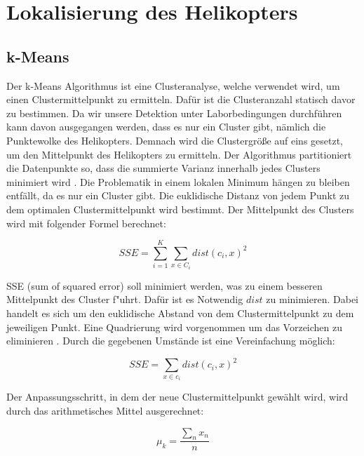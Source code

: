 \section{Lokalisierung des Helikopters} 
\label{sec:lokalisierung}

\subsection{k-Means}
\label{subsec:kmeans}

Der k-Means Algorithmus ist eine Clusteranalyse, welche verwendet wird, um einen Clustermittelpunkt zu ermitteln. Dafür ist die Clusteranzahl statisch davor zu bestimmen. Da wir unsere Detektion unter Laborbedingungen durchführen kann davon ausgegangen werden, dass es nur ein Cluster gibt, nämlich die Punktewolke des Helikopters. Demnach wird die Clustergröße auf eins gesetzt, um den Mittelpunkt des Helikopters zu ermitteln. {Der Algorithmus partitioniert die Datenpunkte so, dass die summierte Varianz innerhalb jedes Clusters minimiert wird} \cite{KM}.\newline
\noindent Die Problematik in einem lokalen Minimum hängen zu bleiben entfällt, da es nur ein Cluster gibt. Die euklidische Distanz von jedem Punkt zu dem optimalen Clustermittelpunkt wird bestimmt. Der Mittelpunkt des Clusters wird mit folgender Formel berechnet:

\begin{equation}
SSE=\sum_{i=1}^K \sum_{x \in C_i} dist(c_i, x)^{2}
\end{equation}

\noindent SSE (sum of squared error) soll minimiert werden, was zu einem besseren Mittelpunkt des Cluster f"uhrt. Dafür ist es Notwendig $dist$ zu minimieren. Dabei
handelt es sich um den euklidische Abstand von dem Clustermittelpunkt zu dem jeweiligen Punkt. Eine Quadrierung wird vorgenommen um das Vorzeichen zu eliminieren \cite{TUM}. Durch die gegebenen Umstände ist eine Vereinfachung möglich:\newline

\begin{equation}
SSE=\sum_{x \in c_i} dist(c_i, x)^{2}
\end{equation}

\noindent Der Anpassungsschritt, in dem der neue Clustermittelpunkt gewählt wird, wird durch das arithmetisches Mittel ausgerechnet:

\begin{equation}
\mu_k = \dfrac{\sum_{n}x_{n}}{n}
\end{equation}

